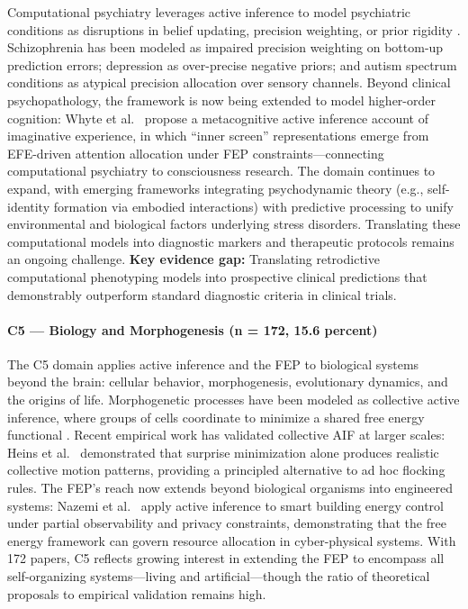 \documentclass[
  english,
]{article}
\begin{document}
Computational psychiatry leverages active inference to model psychiatric
conditions as disruptions in belief updating, precision weighting, or
prior rigidity \citep{smith2021computational}. Schizophrenia has been
modeled as impaired precision weighting on bottom-up prediction errors;
depression as over-precise negative priors; and autism spectrum
conditions as atypical precision allocation over sensory channels.
Beyond clinical psychopathology, the framework is now being extended to
model higher-order cognition: Whyte et
al.~\citep{whyte2025metacognitive} propose a metacognitive active
inference account of imaginative experience, in which ``inner screen''
representations emerge from EFE-driven attention allocation under FEP
constraints---connecting computational psychiatry to consciousness
research. The domain continues to expand, with emerging frameworks
integrating psychodynamic theory (e.g., self-identity formation via
embodied interactions) with predictive processing to unify environmental
and biological factors underlying stress disorders. Translating these
computational models into diagnostic markers and therapeutic protocols
remains an ongoing challenge. \textbf{Key evidence gap:} Translating
retrodictive computational phenotyping models into prospective clinical
predictions that demonstrably outperform standard diagnostic criteria in
clinical trials.

\paragraph{C5 --- Biology and Morphogenesis (n = 172, 15.6
percent)}\label{c5-biology-and-morphogenesis-n-172-15.6-percent}

The C5 domain applies active inference and the FEP to biological systems
beyond the brain: cellular behavior, morphogenesis, evolutionary
dynamics, and the origins of life. Morphogenetic processes have been
modeled as collective active inference, where groups of cells coordinate
to minimize a shared free energy functional
\citep{kuchling2020morphogenesis, levin2022technological}. Recent
empirical work has validated collective AIF at larger scales: Heins et
al.~\citep{heins2024collective} demonstrated that surprise minimization
alone produces realistic collective motion patterns, providing a
principled alternative to ad hoc flocking rules. The FEP's reach now
extends beyond biological organisms into engineered systems: Nazemi et
al.~\citep{nazemi2025energy} apply active inference to smart building
energy control under partial observability and privacy constraints,
demonstrating that the free energy framework can govern resource
allocation in cyber-physical systems. With 172 papers, C5 reflects
growing interest in extending the FEP to encompass all self-organizing
systems---living and artificial---though the ratio of theoretical
proposals to empirical validation remains high.
\end{document}
